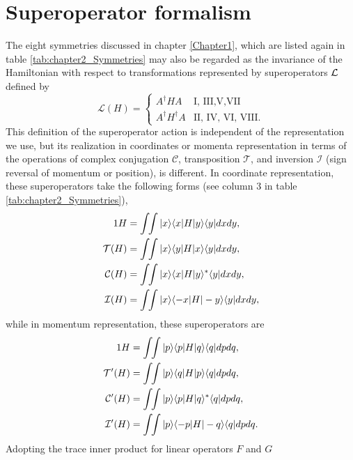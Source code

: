\section{Superoperator formalism\label{sec:chapter2_super}}

The eight symmetries discussed in chapter \ref{Chapter1}, which are listed again in table \ref{tab:chapter2_Symmetries} may also be regarded as the invariance of the Hamiltonian with respect to
transformations represented by superoperators ${\cal L}$ \cite{Simon2018} defined by
%
\begin{equation}
	\mathcal{L}(H)=
	\begin{cases}
		A^\dagger H A &  \text{I, III,V,VII} \\
		A^\dagger H^\dagger A &\text{II, IV, VI, VIII}.
		\end{cases}
\end{equation}
%
This definition of the superoperator action is independent of the representation we use, but its realization in coordinates or momenta representation in terms of the operations of complex conjugation $\mathcal{C}$, transposition $\mathcal{T}$, and inversion $\mathcal{I}$ (sign reversal of momentum or position), is different. In coordinate representation, these superoperators take the following forms (see column 3 in table \ref{tab:chapter2_Symmetries}),
%
\begin{align}
	1 H&=\int\!\!\int |x\ra \la x|H|y\ra\la y| dx dy,
	\nonumber\\
	{\cal T} (H) &=\int\!\!\int |x\ra \la y|H|x\ra\la y| dx dy,
	\nonumber\\
	{\cal C} (H)&=\int\!\!\int |x\ra \la x|H|y\ra^*\la y| dx dy,
	\nonumber\\
	{\cal I} (H)&=\int\!\!\int |x\ra \la -x|H|-y\ra\la y| dx dy,
	\label{eq:chapter2_superoperatorsPosition}
\end{align}
%
while in momentum representation, these superoperators are
%
\begin{align}
	1 H&=\int\!\!\int |p\ra \la p|H|q\ra\la q| dp dq,
	\nonumber\\
	{\cal T}' (H) &=\int\!\!\int |p\ra \la q|H|p\ra\la q| dp dq,
	\nonumber\\
	{\cal C}' (H)&=\int\!\!\int |p\ra \la p|H|q\ra^*\la q| dp dq,
	\nonumber\\
	{\cal I}' (H)&=\int\!\!\int |p\ra \la -p|H|-q\ra\la q| dp dq.
	\label{eq:chapter2_superoperatorsMomentum}
\end{align}
%
Adopting the trace inner product for linear operators $F$ and $G$
%
